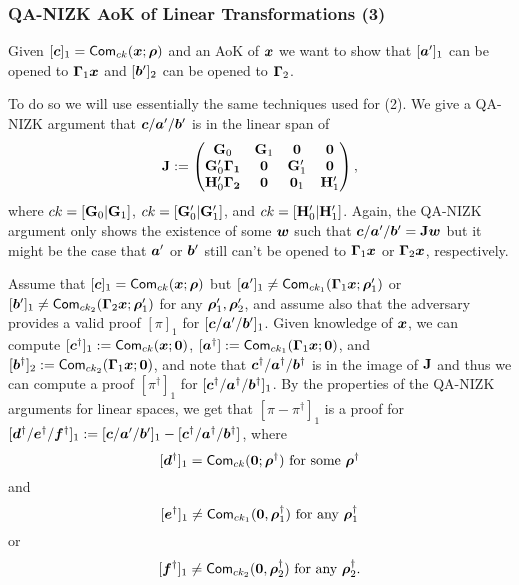 \subsubsection{QA-NIZK AoK of Linear Transformations (3)}
Given $[{\boldsymbol{c}}]_1=\mathsf{Com}_{ck}({\boldsymbol{x}};{\boldsymbol{\rho}})$ and an AoK of ${\boldsymbol{x}}$ we want to show that $[{\boldsymbol{a}}']_1$ can be opened to $\mathbf{{\Gamma}}_1{\boldsymbol{x}}$ and $[{\boldsymbol{b}}']_2$ can be opened to $\mathbf{{\Gamma}}_2$.

To do so we will use essentially the same techniques used for (2). We give a QA-NIZK argument that ${\boldsymbol{c}}/{\boldsymbol{a}}'/{\boldsymbol{b}}'$ is in the linear span of
$$
\mathbf{{J}}:=
\begin{pmatrix}
\mathbf{{G}}_0                              & \mathbf{{G}}_1 & \mathbf{{0}}      & \mathbf{{0}} \\
\mathbf{{G}}'_0\mathbf{{\Gamma_1}}& \mathbf{{0}}     & \mathbf{{G}}'_1 & \mathbf{{0}} \\
\mathbf{{H}}'_0\mathbf{{\Gamma_2}}& \mathbf{{0}}    & \mathbf{{0}}_1   & \mathbf{{H}}'_1 
\end{pmatrix},
$$
where $ck=[\mathbf{{G}}_0|\mathbf{{G}}_1]$, $ck=[\mathbf{{G}}'_0|\mathbf{{G}}'_1]$, and $ck=[\mathbf{{H}}'_0|\mathbf{{H}}'_1]$.
Again, the QA-NIZK argument only shows the existence of some ${\boldsymbol{w}}$ such that ${\boldsymbol{c}}/{\boldsymbol{a}}'/{\boldsymbol{b}}' = \mathbf{{J}}{\boldsymbol{w}}$ but it might be the case that ${\boldsymbol{a}}'$ or ${\boldsymbol{b}}'$ still can't be opened to $\mathbf{{\Gamma}}_1{\boldsymbol{x}}$ or  $\mathbf{{\Gamma}}_2{\boldsymbol{x}}$, respectively.

Assume that $[{\boldsymbol{c}}]_1 = \mathsf{Com}_{ck}({\boldsymbol{x}};{\boldsymbol{\rho}})$ but $[{\boldsymbol{a}}']_1\neq \mathsf{Com}_{ck_1}(\mathbf{{\Gamma}}_1{\boldsymbol{x}};{\boldsymbol{\rho}}'_1)$ or $[{\boldsymbol{b}}']_1\neq \mathsf{Com}_{ck_2}(\mathbf{{\Gamma}}_2{\boldsymbol{x}};{\boldsymbol{\rho}}'_1)$ for any ${\boldsymbol{\rho}}'_1,{\boldsymbol{\rho}}'_2$, and assume also that the adversary provides a valid proof $[\pi]_1$ for $[{\boldsymbol{c}}/{\boldsymbol{a}}'/{\boldsymbol{b}}']_1$. Given knowledge of ${\boldsymbol{x}}$, we can compute $[{\boldsymbol{c}}^\dag]_1:=\mathsf{Com}_{ck}({\boldsymbol{x}};{\boldsymbol{0}})$, $[{\boldsymbol{a}}^\dag]:=\mathsf{Com}_{ck_1}(\mathbf{{\Gamma}}_1{\boldsymbol{x}};{\boldsymbol{0}})$, and $[{\boldsymbol{b}}^\dag]_2:=\mathsf{Com}_{ck_2}(\mathbf{{\Gamma}}_1{\boldsymbol{x}};{\boldsymbol{0}})$, and note that ${\boldsymbol{c}}^\dag/{\boldsymbol{a}}^\dag/{\boldsymbol{b}}^\dag$ is in the image of $\mathbf{{J}}$ and thus we can compute a proof $[\pi^\dag]_1$ for $[{\boldsymbol{c}}^\dag/{\boldsymbol{a}}^\dag/{\boldsymbol{b}}^\dag]_1$. By the properties of the QA-NIZK arguments for linear spaces, we get that $[\pi-\pi^\dag]_1$ is a proof for $[{\boldsymbol{d}}^\dag/{\boldsymbol{e}}^\dag/{\boldsymbol{f}}^\dag]_1:=[{\boldsymbol{c}}/{\boldsymbol{a}}'/{\boldsymbol{b}}']_1-[{\boldsymbol{c}}^\dag/{\boldsymbol{a}}^\dag/{\boldsymbol{b}}^\dag]$, where
$$[{\boldsymbol{d}}^\dag]_1 = \mathsf{Com}_{ck}({\boldsymbol{0}};{\boldsymbol{\rho}}^\dag)\text{ for some }{\boldsymbol{\rho}}^\dag$$
and
$$[{\boldsymbol{e}}^\dag]_1 \neq\mathsf{Com}_{ck_1}({\boldsymbol{0}},{\boldsymbol{\rho}}^\dag_1) \text{ for any }{\boldsymbol{\rho}}^\dag_1$$ 
or
$$[{\boldsymbol{f}}^\dag]_1 \neq\mathsf{Com}_{ck_2}({\boldsymbol{0}},{\boldsymbol{\rho}}^\dag_2) \text{ for any }{\boldsymbol{\rho}}_2^\dag.$$

